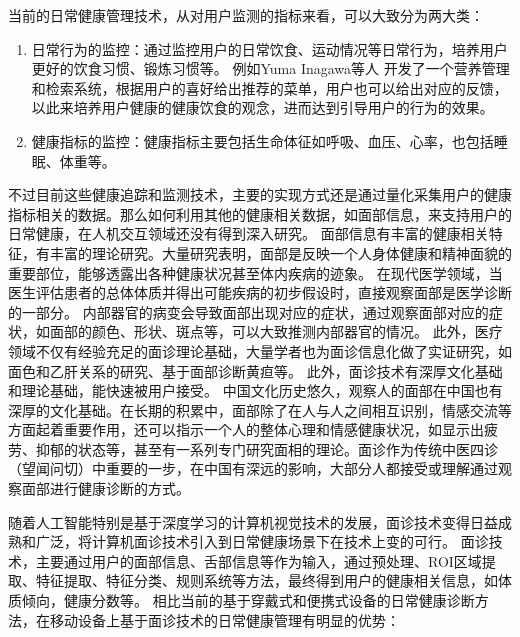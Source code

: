 当前的日常健康管理技术，从对用户监测的指标来看，可以大致分为两大类：

\begin{enumerate}
    \item 日常行为的监控：通过监控用户的日常饮食、运动情况等日常行为，培养用户更好的饮食习惯、锻炼习惯等\cite{purpura2011fit4life,Inagawa2013A,bravata2007using,cordeiro2015barriers,lin2006fish, miller2014stepstream}。 例如Yuma Inagawa等人\cite{Inagawa2013A} 开发了一个营养管理和检索系统，根据用户的喜好给出推荐的菜单，用户也可以给出对应的反馈，以此来培养用户健康的健康饮食的观念，进而达到引导用户的行为的效果。
    \item 健康指标的监控：健康指标主要包括生命体征如呼吸、血压、心率，也包括睡眠、体重等\cite{kay2012lullaby,gronvall2013beyond,logan2007mobile,walters2010a}。
\end{enumerate}

不过目前这些健康追踪和监测技术，主要的实现方式还是通过量化采集用户的健康指标相关的数据。那么如何利用其他的健康相关数据，如面部信息，来支持用户的日常健康，在人机交互领域还没有得到深入研究。
面部信息有丰富的健康相关特征，有丰富的理论研究。大量研究表明，面部是反映一个人身体健康和精神面貌的重要部位，能够透露出各种健康状况甚至体内疾病的迹象。
在现代医学领域，当医生评估患者的总体体质并得出可能疾病的初步假设时，直接观察面部是医学诊断的一部分\cite{Clifford2006Shortliffe}。
内部器官的病变会导致面部出现对应的症状，通过观察面部对应的症状，如面部的颜色、形状、斑点等，可以大致推测内部器官的情况\cite{杨淑芳2002伤寒六经辨证初探}。
此外，医疗领域不仅有经验充足的面诊理论基础，大量学者也为面诊信息化做了实证研究，如面色和乙肝关系的研究\cite{杨宏志2007慢性乙型肝炎肝硬化中医面部五色诊断与临床病理的相关性研究, Li2008Therapeutic}、基于面部诊断黄疸\cite{艾英1998黄疸病人面部色泽定量实验研究}等。
此外，面诊技术有深厚文化基础和理论基础，能快速被用户接受。
中国文化历史悠久，观察人的面部在中国也有深厚的文化基础。在长期的积累中，面部除了在人与人之间相互识别，情感交流等方面起着重要作用，还可以指示一个人的整体心理和情感健康状况，如显示出疲劳、抑郁的状态等，甚至有一系列专门研究面相的理论。面诊作为传统中医四诊（望闻问切）中重要的一步，在中国有深远的影响，大部分人都接受或理解通过观察面部进行健康诊断的方式。


随着人工智能特别是基于深度学习的计算机视觉技术的发展，面诊技术变得日益成熟和广泛，将计算机面诊技术引入到日常健康场景下在技术上变的可行。
面诊技术，主要通过用户的面部信息、舌部信息等作为输入，通过预处理、ROI区域提取、特征提取、特征分类、规则系统等方法，最终得到用户的健康相关信息，如体质倾向，健康分数等\cite{林锋2019中医面诊系统调研报告}。
相比当前的基于穿戴式和便携式设备的日常健康诊断方法，在移动设备上基于面诊技术的日常健康管理有明显的优势：

